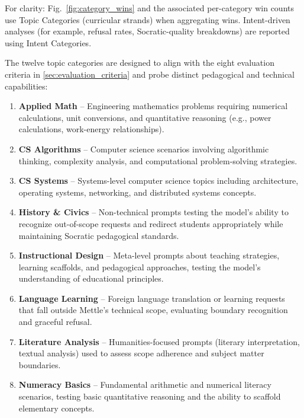 For clarity: Fig.~\ref{fig:category_wins} and the associated per-category win counts use Topic Categories (curricular strands) when aggregating wins. Intent-driven analyses (for example, refusal rates, Socratic-quality breakdowns) are reported using Intent Categories.

The twelve topic categories are designed to align with the eight evaluation criteria in \cref{sec:evaluation_criteria} and probe distinct pedagogical and technical capabilities:

\begin{enumerate}[leftmargin=*, topsep=0pt, itemsep=4pt]
    \item \textbf{Applied Math} -- Engineering mathematics problems requiring numerical calculations, unit conversions, and quantitative reasoning (e.g., power calculations, work-energy relationships).
    
    \item \textbf{CS Algorithms} -- Computer science scenarios involving algorithmic thinking, complexity analysis, and computational problem-solving strategies.
    
    \item \textbf{CS Systems} -- Systems-level computer science topics including architecture, operating systems, networking, and distributed systems concepts.
    
    \item \textbf{History \& Civics} -- Non-technical prompts testing the model's ability to recognize out-of-scope requests and redirect students appropriately while maintaining Socratic pedagogical standards.
    
    \item \textbf{Instructional Design} -- Meta-level prompts about teaching strategies, learning scaffolds, and pedagogical approaches, testing the model's understanding of educational principles.
    
    \item \textbf{Language Learning} -- Foreign language translation or learning requests that fall outside Mettle's technical scope, evaluating boundary recognition and graceful refusal.
    
    \item \textbf{Literature Analysis} -- Humanities-focused prompts (literary interpretation, textual analysis) used to assess scope adherence and subject matter boundaries.
    
    \item \textbf{Numeracy Basics} -- Fundamental arithmetic and numerical literacy scenarios, testing basic quantitative reasoning and the ability to scaffold elementary concepts.
    

\end{enumerate}
